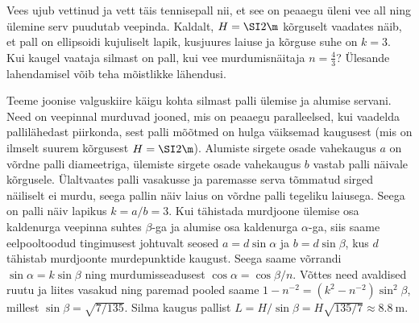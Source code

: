 
Vees ujub vettinud ja vett täis tennisepall nii, et see on peaaegu üleni vee all ning ülemine serv puudutab veepinda. Kaldalt, $H=\SI 2\m$ kõrguselt vaadates näib, et pall on ellipsoidi kujuliselt lapik, kusjuures laiuse ja kõrguse suhe on $k=3$. Kui kaugel vaataja silmast on pall, kui vee murdumisnäitaja $n=\frac 43$? Ülesande lahendamisel võib teha mõistlikke lähendusi.


\hint

\solu
\par
Teeme joonise valguskiire käigu kohta silmast palli ülemise ja alumise servani. Need on veepinnal murduvad jooned, mis on peaaegu paralleelsed, kui vaadelda pallilähedast piirkonda, sest palli mõõtmed on hulga väiksemad kaugusest (mis on ilmselt suurem kõrgusest $H=\SI 2\m$). Alumiste sirgete osade vahekaugus $a$ on võrdne palli diameetriga, ülemiste sirgete osade vahekaugus $b$ vastab palli näivale kõrgusele. Ülaltvaates palli vasakusse ja paremasse serva tõmmatud sirged näiliselt ei murdu, seega pallin näiv laius on võrdne palli tegeliku laiusega. Seega on palli näiv lapikus $k=a/b=3$. Kui tähistada murdjoone ülemise osa kaldenurga veepinna suhtes $\beta$-ga ja alumise osa kaldenurga $\alpha$-ga, siis saame eelpooltoodud tingimusest johtuvalt seosed $a=d\sin\alpha$ ja $b=d\sin\beta$, kus $d$ tähistab murdjoonte murdepunktide kaugust. Seega saame võrrandi $\sin\alpha=k\sin\beta$ ning murdumisseadusest  $\cos\alpha=\cos\beta/n$. Võttes need avaldised ruutu ja liites vasakud ning paremad pooled saame $1-n^{-2}=(k^2-n^{-2})\sin^2\beta$, millest $\sin\beta=\sqrt{7/135}$. Silma kaugus pallist $L=H/\sin\beta=H\sqrt{135/7}\approx\SI{8.8}\m$.
\probend